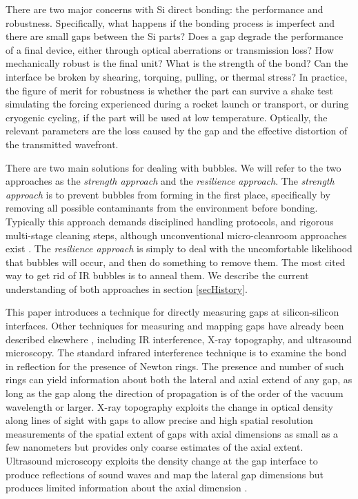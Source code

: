 \documentclass[osajnl,preprint,showpacs,superscriptaddress,12pt]{revtex4-1} %
\begin{document}
There are two major concerns with Si direct bonding: the performance and robustness.  Specifically, what happens if the bonding process is imperfect and there are small gaps between the Si parts?  Does a gap degrade the performance of a final device, either through optical aberrations or transmission loss?  How mechanically robust is the final unit?  What is the strength of the bond?  Can the interface be broken by shearing, torquing, pulling, or thermal stress?  In practice, the figure of merit for robustness is whether the part can survive a shake test simulating the forcing experienced during a rocket launch or transport, or during cryogenic cycling, if the part will be used at low temperature.  Optically, the relevant parameters are the loss caused by the gap and the effective distortion of the transmitted wavefront.

There are two main solutions for dealing with bubbles.  We will refer to the two approaches as the \emph{strength approach} and the \emph{resilience approach}.  The \emph{strength approach} is to prevent bubbles from forming in the first place, specifically by removing all possible contaminants from the environment before bonding.  Typically this approach demands disciplined handling protocols, and rigorous multi-stage cleaning steps, although unconventional micro-cleanroom approaches exist \cite{1989JaJAP..28L2141L}.  The \emph{resilience approach} is simply to deal with the uncomfortable likelihood that bubbles will occur, and then do something to remove them.  The most cited way to get rid of IR bubbles is to anneal them\cite{Mitani1990}.  We describe the current understanding of both approaches in section \ref{secHistory}.

This paper introduces a technique for directly measuring gaps at silicon-silicon interfaces.  Other techniques for measuring and mapping gaps have already been described elsewhere \cite{1992JEMat..21..669M}, including IR interference\cite{Mitani1990}, X-ray topography\cite{1994JaJAP..33....6H}, and ultrasound microscopy\cite{2000RScI...71.1869G}.  The standard infrared interference technique is to examine the bond in reflection for the presence of Newton rings.  The presence and number of such rings can yield information about both the lateral and axial extend of any gap, as long as the gap along the direction of propagation is of the order of the vacuum wavelength or larger.  X-ray topography \cite{1992JEMat..21..669M,1994JaJAP..33....6H} exploits the change in optical density along lines of sight with gaps to allow precise and high spatial resolution measurements of the spatial extent of gaps with axial dimensions as small as a few nanometers but provides only coarse estimates of the axial extent.  Ultrasound microscopy exploits the density change at the gap interface to produce reflections of sound waves and map the lateral gap dimensions but produces limited information about the axial dimension \cite{2000RScI...71.1869G}.
\end{document}
